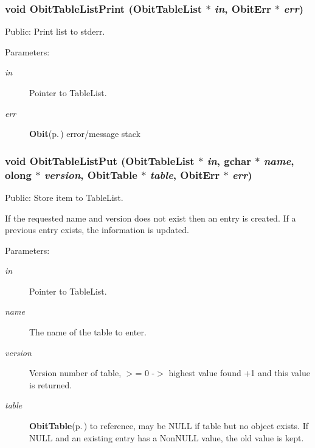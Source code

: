 \subsubsection{\setlength{\rightskip}{0pt plus 5cm}void Obit\-Table\-List\-Print ({\bf Obit\-Table\-List} $\ast$ {\em in}, {\bf Obit\-Err} $\ast$ {\em err})}\label{ObitTableList_8h_a17}


Public: Print list to stderr. 

\begin{Desc}
\item[Parameters:]
\begin{description}
\item[{\em in}]Pointer to Table\-List. \item[{\em err}]{\bf Obit}{\rm (p.\,\pageref{structObit})} error/message stack \end{description}
\end{Desc}
\subsubsection{\setlength{\rightskip}{0pt plus 5cm}void Obit\-Table\-List\-Put ({\bf Obit\-Table\-List} $\ast$ {\em in}, gchar $\ast$ {\em name}, {\bf olong} $\ast$ {\em version}, {\bf Obit\-Table} $\ast$ {\em table}, {\bf Obit\-Err} $\ast$ {\em err})}\label{ObitTableList_8h_a12}


Public: Store item to Table\-List. 

If the requested name and version does not exist then an entry is created. If a previous entry exists, the information is updated. \begin{Desc}
\item[Parameters:]
\begin{description}
\item[{\em in}]Pointer to Table\-List. \item[{\em name}]The name of the table to enter. \item[{\em version}]Version number of table, $>$= 0 -$>$ highest value found +1 and this value is returned. \item[{\em table}]{\bf Obit\-Table}{\rm (p.\,\pageref{structObitTable})} to reference, may be NULL if table but no object exists. If NULL and an existing entry has a Non\-NULL value, the old value is kept. \end{description}
\end{Desc}
